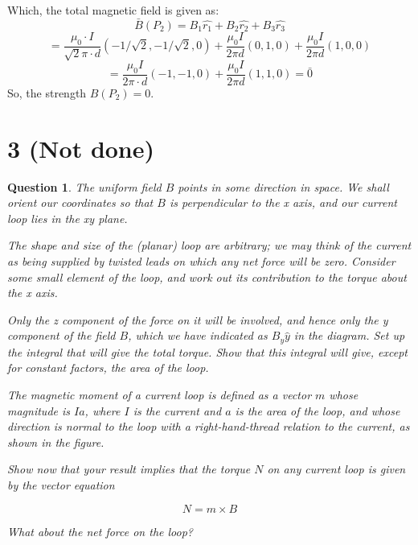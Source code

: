 \documentclass{article}
\newtheorem{question}{Question}
\begin{document}
\hfill

Which, the total magnetic field is given as:
$$\bar{B}(P_2) = B_1\hat{r_1}+B_2\hat{r_2}+B_3\hat{r_3}$$
$$= \frac{\mu_0 \cdot I}{\sqrt{2}\pi \cdot d}(-1/\sqrt{2},-1/\sqrt{2},0) + \frac{\mu_0 I}{2\pi d}(0,1,0)+\frac{\mu_0 I}{2\pi d}(1,0,0)$$
$$ = \frac{\mu_0I}{2\pi\cdot d}(-1,-1,0) + \frac{\mu_0I}{2\pi d}(1,1,0) = \bar{0}$$
So, the strength $B(P_2)=0$.

\hfill

\hfill

\section*{3 (Not done)}
\begin{myBox}[]{}
    \begin{question}
        The uniform field $B$ points in some direction in space. We shall orient our coordinates
        so that $B$ is perpendicular to the x axis, and our current loop lies in
        the xy plane. 
        
        The shape and size of the (planar)
        loop are arbitrary; we may think of the current as being supplied
        by twisted leads on which any net force will be zero. Consider
        some small element of the loop, and work out its contribution to
        the torque about the x axis. 
        
        Only the z component of the force on
        it will be involved, and hence only the y component of the field $B$,
        which we have indicated as $B_y\hat{y}$ in the diagram. Set up the integral
        that will give the total torque. Show that this integral will give,
        except for constant factors, the area of the loop.

        \hfill

        The magnetic moment of a current loop is defined as a vector $m$ whose magnitude is $Ia$, 
        where $I$ is the current and $a$ is the area of the loop, 
        and whose direction is normal to the loop with
        a right-hand-thread relation to the current, as shown in the figure. 
        
        Show now that your result implies that the torque $N$
        on any current loop is given by the vector equation

        $$N=m\times B$$

        What about the net force on the loop?
    \end{question}
\end{myBox}
\end{document}
